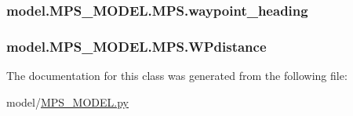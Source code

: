 \subsubsection[{waypoint\+\_\+heading}]{\setlength{\rightskip}{0pt plus 5cm}model.\+M\+P\+S\+\_\+\+M\+O\+D\+E\+L.\+M\+P\+S.\+waypoint\+\_\+heading}\label{classmodel_1_1MPS__MODEL_1_1MPS_a96d9a3fcd3cfea8f85d3255742a00995}
\hypertarget{classmodel_1_1MPS__MODEL_1_1MPS_a3e79c73cf4a5a655b367ccb1302c5fb6}{}
\subsubsection[{W\+Pdistance}]{\setlength{\rightskip}{0pt plus 5cm}model.\+M\+P\+S\+\_\+\+M\+O\+D\+E\+L.\+M\+P\+S.\+W\+Pdistance}\label{classmodel_1_1MPS__MODEL_1_1MPS_a3e79c73cf4a5a655b367ccb1302c5fb6}


The documentation for this class was generated from the following file\+:\begin{DoxyCompactItemize}
\item 
model/\hyperlink{MPS__MODEL_8py}{M\+P\+S\+\_\+\+M\+O\+D\+E\+L.\+py}\end{DoxyCompactItemize}
